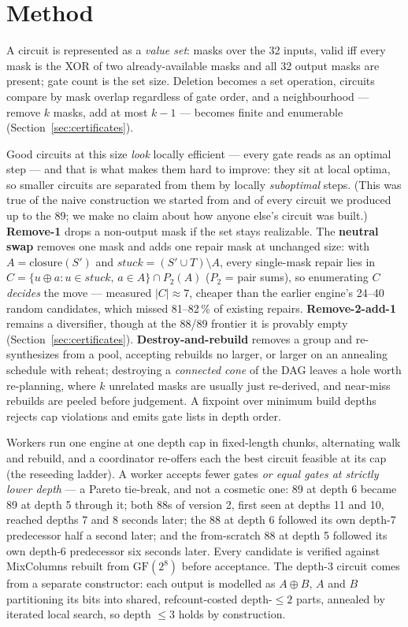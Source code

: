 \documentclass[11pt,a4paper]{article}
\begin{document}
\section{Method}

A circuit is represented as a \emph{value set}: masks over the 32 inputs, valid
iff every mask is the XOR of two already-available masks and all 32 output
masks are present; gate count is the set size. Deletion becomes a set
operation, circuits compare by mask overlap regardless of gate order, and a
neighbourhood --- remove $k$ masks, add at most $k-1$ --- becomes finite and
enumerable (Section~\ref{sec:certificates}).

Good circuits at this size \emph{look} locally efficient --- every gate reads as
an optimal step --- and that is what makes them hard to improve: they sit at
local optima, so smaller circuits are separated from them by locally
\emph{suboptimal} steps. (This was true of the naive construction we started
from and of every circuit we produced up to the 89; we make no claim about how
anyone else's circuit was built.) \textbf{Remove-1} drops a non-output mask if the set
stays realizable. The
\textbf{neutral swap} removes one mask and adds one repair mask at unchanged
size: with $A = \mathrm{closure}(S')$ and $\mathit{stuck} = (S' \cup T)
\setminus A$, every single-mask repair lies in $C = \{u \oplus a : u \in
\mathit{stuck},\, a \in A\} \cap P_2(A)$ ($P_2$ = pair sums), so enumerating
$C$ \emph{decides} the move --- measured $|C| \approx 7$, cheaper than the
earlier engine's 24--40 random candidates, which missed 81--82\,\% of existing
repairs. \textbf{Remove-2-add-1} remains a diversifier, though at the 88/89
frontier it is provably empty (Section~\ref{sec:certificates}).
\textbf{Destroy-and-rebuild} removes a group and re-synthesizes from a pool,
accepting rebuilds no larger, or larger on an annealing schedule with reheat;
destroying a \emph{connected cone} of the DAG leaves a hole worth re-planning,
where $k$ unrelated masks are usually just re-derived, and near-miss rebuilds
are peeled before judgement. A fixpoint over minimum build depths rejects cap
violations and emits gate lists in depth order.

Workers run one engine at one depth cap in fixed-length chunks, alternating
walk and rebuild, and a coordinator re-offers each the best circuit feasible at
its cap (the reseeding ladder). A worker accepts fewer gates \emph{or equal
gates at strictly lower depth} --- a Pareto tie-break, and not a cosmetic one:
89 at depth 6 became 89 at depth 5 through it; both 88s of version 2, first seen
at depths 11 and 10, reached depths 7 and 8 seconds later; the 88 at depth 6
followed its own depth-7 predecessor half a second later; and the from-scratch
88 at depth 5 followed its own depth-6 predecessor six seconds later. Every candidate is
verified against MixColumns rebuilt from $\mathrm{GF}(2^8)$ before acceptance.
The depth-3 circuit comes from a separate constructor: each output is modelled
as $A \oplus B$, $A$ and $B$ partitioning its bits into shared,
refcount-costed depth-$\le 2$ parts, annealed by iterated local search, so
depth $\le 3$ holds by construction.
\end{document}
